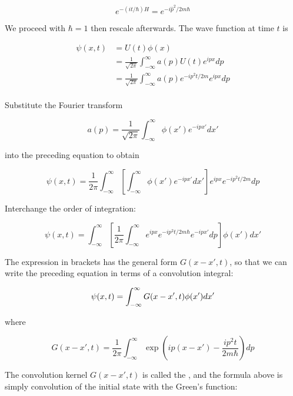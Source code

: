 \begin{equation}
e^{-(it/\hbar)H} = e^{-i\hat p^2/2m\hbar}
\end{equation}

We proceed with $\hbar = 1$ then rescale afterwards.
The wave function at time $t$ is

\begin{align}
\psi(x,t) &= U(t)\phi(x) \\
&= \frac{1}{\sqrt{2\pi}}\int_{-\infty}^\infty a(p) U(t)e^{ipx} dp\\
&= \frac{1}{\sqrt{2\pi}}\int_{-\infty}^\infty a(p) e^{-i p^2t/2m} e^{ipx} dp \\
\end{align}

Substitute the Fourier transform

\begin{equation}
a(p) = \frac{1}{\sqrt{2\pi}}\int_{-\infty}^\infty \phi(x') e^{-ipx'} dx'
\end{equation}

into the preceding equation to obtain

\begin{equation}
\psi(x,t) = \frac{1}{2\pi} \int_{-\infty}^\infty  \left[  \int_{-\infty}^\infty \phi(x') e^{-ipx'} dx'\right] e^{ipx}  e^{ -ip^2t/2m } dp
\end{equation}

Interchange the order of integration:

\begin{equation}
\psi(x,t) = \int_{-\infty}^\infty  \left[ \frac{1}{2\pi}  \int_{-\infty}^\infty e^{ipx} e^{ -ip^2t/2m \hbar} e^{-ipx'} dp \right] \phi(x')  dx'
\end{equation}

The expression in brackets has the general form $G(x-x',t)$, so that we can write the preceding equation in terms of a convolution integral:

\begin{equation}
\psi(x,t) = \int_{-\infty}^\infty G(x-x', t)\phi(x') dx'\\
\end{equation}

where

\begin{equation}
\label{gffp}
G(x-x',t) = \frac{1}{2\pi}  \int_{-\infty}^\infty   \exp\left(ip(x-x')  -\frac{ip^2t}{2m \hbar} \right) dp
\end{equation}

The convolution kernel $G(x-x',t)$ is called the , and the formula above is simply convolution of the initial state with the Green's function:

